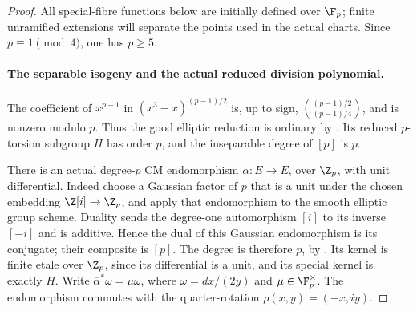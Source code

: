 \begin{proof}
All special-fibre functions below are initially defined over
\(\F_p\); finite unramified extensions will separate the
points used in the actual charts. Since \(p\equiv1\pmod4\),
one has \(p\ge5\).

\paragraph{The separable isogeny and the actual reduced division polynomial.}
The coefficient of \(x^{p-1}\) in
\((x^3-x)^{(p-1)/2}\) is, up to sign,
\(\binom{(p-1)/2}{(p-1)/4}\), and is nonzero modulo \(p\).
Thus the good elliptic reduction is ordinary by
\cite[Theorem V.4.1(a), p.148]{fghSilvermanAEC}.
Its reduced \(p\)-torsion subgroup \(H\) has order \(p\),
and the inseparable degree of \([p]\) is \(p\).

There is an actual degree-\(p\) CM endomorphism
\(\alpha:E\to E\), over \(\Z_p\), with unit differential.
Indeed choose a Gaussian factor of \(p\) that is a unit
under the chosen embedding \(\Z[i]\to\Z_p\), and apply
that endomorphism to the smooth elliptic group scheme.
Duality sends the degree-one automorphism \([i]\)
to its inverse \([-i]\) and is additive. Hence the
dual of this Gaussian endomorphism is its conjugate;
their composite is \([p]\). The degree is therefore
\(p\), by \cite[Theorem III.6.2(a),(c),(d), p.83]{fghSilvermanAEC}.
Its kernel is finite etale over \(\Z_p\), since its
differential is a unit, and its special kernel is exactly
\(H\). Write \(\overline\alpha^*\omega=\mu\omega\),
where \(\omega=dx/(2y)\) and \(\mu\in\F_p^\times\).
The endomorphism commutes with the quarter-rotation
\(\rho(x,y)=(-x,iy)\).


\end{proof}
